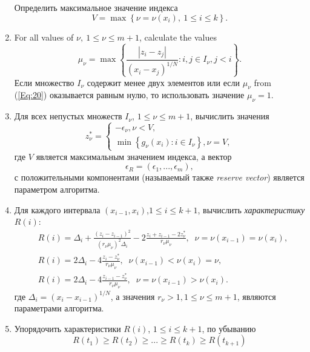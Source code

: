 \documentclass[
11pt,%
tightenlines,%
twoside,%
onecolumn,%
nofloats,%
nobibnotes,%
nofootinbib,%
superscriptaddress,%
noshowpacs,%
centertags]%
{revtex4}
\begin{document}
\begin{enumerate}
Определить максимальное значение индекса
\begin{equation}\label{Eq:19}
V=\max \left\{\nu = \nu(x_i), \ 1\leq i \leq k\right\}.
\end{equation}
\item
For all values of $\nu, \ 1\leq \nu \leq m+1$, calculate the values  
\begin{equation}\label{Eq:20}
\mu_\nu = \max \left\{ \frac{\left|z_i-z_j\right|}{\left(x_i-x_j\right)^{1/N}} : i,j \in I_\nu, j<i\right\}.
\end{equation}
Если множество  $I_\nu$ содержит менее двух элементов или если $\mu_\nu$ from (\ref{Eq:20}) оказывается равным нулю, то использовать значение $\mu_\nu=1$.
\item
Для всех непустых множеств  $I_\nu$, $1 \leq \nu \leq m+1$, вычислить значения
\begin{equation}\label{Eq:21}
  z^\ast_\nu =  
   \begin{cases}
    -\epsilon_\nu,  \nu < V, \\
    \min{\left\{g_\nu(x_i):i\in I_\nu\right\}}, \nu = V,
   \end{cases}
\end{equation}
где $V$ является максимальным значением индекса, а вектор
\begin{equation}\label{Eq:22}
\epsilon _R=\left(\epsilon_1,...,\epsilon_m\right),
\end{equation}
с положительными компонентами (называемый также \textit{reserve vector}) является параметром алгоритма.
\item
Для каждого интервала  $(x_{i-1},x_i)$,$1 \leq i \leq k+1$, вычислить \textit{характеристику} $R(i)$: 
\begin{eqnarray}\label{R}
&R(i)=\Delta_i+ \frac{(z_i-z_{i-1})^2}{(r_\nu\mu_\nu)^2\Delta_i}-2\frac{z_i+z_{i-1}-2z^\ast_\nu}{r_\nu\mu_\nu},\;\; \nu=\nu(x_{i-1})=\nu(x_i),\nonumber \\
&R(i)= 2\Delta_i-4\frac{z_i-z^\ast_\nu}{r_\nu\mu_\nu},\;\; \nu(x_{i-1})<\nu(x_i)=\nu,\\
&R(i)= 2\Delta_i-4\frac{z_{i-1}-z^\ast_\nu}{r_\nu\mu_\nu},\;\; \nu = \nu(x_{i-1})>\nu(x_i).\nonumber
\end{eqnarray}
где $\Delta_i=(x_i-x_{i-1})^{1/N}$, а значения $r_\nu>1, 1\leq\nu\leq m+1$, являются параметрами алгоритма.
\item
Упорядочить характеристики $R(i)$, $1\leq i \leq k+1$, по убыванию  	
\begin{equation}\label{Eq:23}
R(t_1)\geq R(t_2)\geq ... \geq R(t_{k})\geq R(t_{k+1})

\end{equation}
\end{enumerate}
\end{document}
